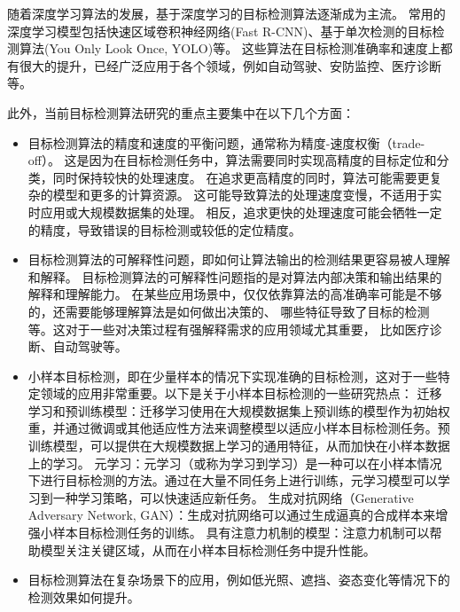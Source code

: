 随着深度学习算法的发展，基于深度学习的目标检测算法逐渐成为主流。
常用的深度学习模型包括快速区域卷积神经网络(Fast R-CNN)\cite{girshick2015fast}、基于单次检测的目标检测算法(You Only Look Once, YOLO)\cite{jiang2022review}等。
这些算法在目标检测准确率和速度上都有很大的提升，已经广泛应用于各个领域，例如自动驾驶、安防监控、医疗诊断等。
\par
此外，当前目标检测算法研究的重点主要集中在以下几个方面：
\begin{itemize}[itemindent=2em]
    \item 目标检测算法的精度和速度的平衡问题，通常称为精度-速度权衡（trade-off）。
    这是因为在目标检测任务中，算法需要同时实现高精度的目标定位和分类，同时保持较快的处理速度。
    在追求更高精度的同时，算法可能需要更复杂的模型和更多的计算资源。
    这可能导致算法的处理速度变慢，不适用于实时应用或大规模数据集的处理。
    相反，追求更快的处理速度可能会牺牲一定的精度，导致错误的目标检测或较低的定位精度。
    
    \item 目标检测算法的可解释性问题，即如何让算法输出的检测结果更容易被人理解和解释。
    目标检测算法的可解释性问题指的是对算法内部决策和输出结果的解释和理解能力。
    在某些应用场景中，仅仅依靠算法的高准确率可能是不够的，还需要能够理解算法是如何做出决策的、
    哪些特征导致了目标的检测等。这对于一些对决策过程有强解释需求的应用领域尤其重要，
    比如医疗诊断、自动驾驶等。
    
    \item 小样本目标检测，即在少量样本的情况下实现准确的目标检测，这对于一些特定领域的应用非常重要。以下是关于小样本目标检测的一些研究热点：
    迁移学习和预训练模型\cite{zhuang2020comprehensive}：迁移学习使用在大规模数据集上预训练的模型作为初始权重，并通过微调或其他适应性方法来调整模型以适应小样本目标检测任务。预训练模型，可以提供在大规模数据上学习的通用特征，从而加快在小样本数据上的学习。
    元学习\cite{hospedales2021meta}：元学习（或称为学习到学习）是一种可以在小样本情况下进行目标检测的方法。通过在大量不同任务上进行训练，元学习模型可以学习到一种学习策略，可以快速适应新任务。
    生成对抗网络（Generative Adversary Network, GAN）：生成对抗网络可以通过生成逼真的合成样本来增强小样本目标检测任务的训练。
    具有注意力机制的模型：注意力机制可以帮助模型关注关键区域，从而在小样本目标检测任务中提升性能。
    
    \item 目标检测算法在复杂场景下的应用，例如低光照、遮挡、姿态变化等情况下的检测效果如何提升。
    
\end{itemize}


